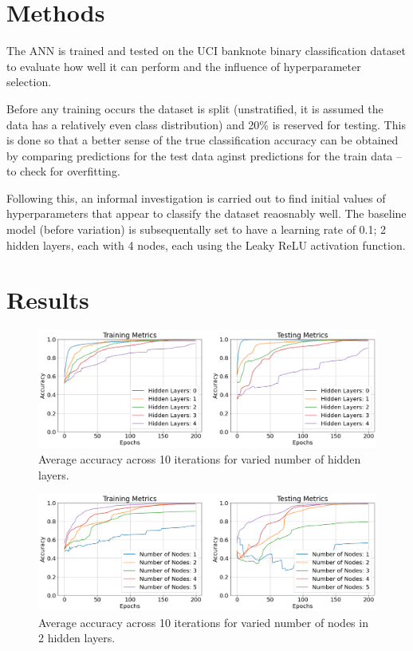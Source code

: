 \documentclass{article}
\begin{document}
\section{Methods}

The ANN is trained and tested on the UCI banknote binary
classification dataset to evaluate how well it can perform and the
influence of hyperparameter selection.

Before any training occurs the dataset is split (unstratified, it is
assumed the data has a relatively even class distribution) and 20\%
is reserved for testing. This is done so that a better sense of the
true classification accuracy can be obtained by comparing predictions
for the test data aginst predictions for the train data -- to check for
overfitting.

Following this, an informal investigation is carried out to find initial
values of hyperparameters that appear to classify the dataset reaosnably
well. The baseline model (before variation) is subsequentally set to
have a learning rate of 0.1; 2 hidden layers, each with 4 nodes,
each using the Leaky ReLU activation function.


\section{Results}


\begin{figure}[H]
  \centering
  \includegraphics[width=\textwidth]{figs/layers.png}
  \caption{
    Average accuracy across 10 iterations for varied number of hidden
    layers.
  }
  \label{fig:layers}
\end{figure}

\begin{figure}[H]
  \centering
  \includegraphics[width=\textwidth]{figs/nodes.png}
  \caption{
    Average accuracy across 10 iterations for varied number of nodes
    in 2 hidden layers.
  }
  \label{fig:nodes}
\end{figure}
\end{document}
